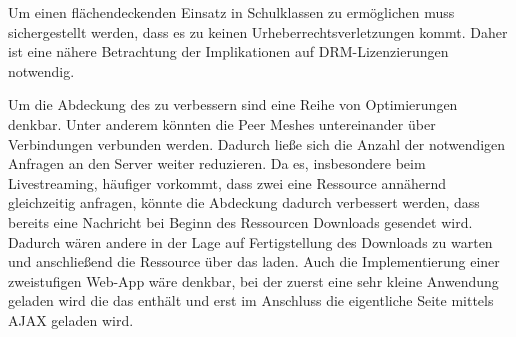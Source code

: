 Um einen flächendeckenden Einsatz in Schulklassen zu ermöglichen muss sichergestellt werden, dass es zu keinen Urheberrechtsverletzungen kommt. Daher ist eine nähere Betrachtung der Implikationen auf DRM-Lizenzierungen notwendig.

Um die Abdeckung des \pTp \cdns zu verbessern sind eine Reihe von Optimierungen denkbar. Unter anderem könnten die Peer Meshes untereinander über \pTp Verbindungen verbunden werden. Dadurch ließe sich die Anzahl der notwendigen Anfragen an den Server weiter reduzieren. Da es, insbesondere beim Livestreaming, häufiger vorkommt, dass zwei \clients eine Ressource annähernd gleichzeitig anfragen, könnte die Abdeckung dadurch verbessert werden, dass bereits eine Nachricht bei Beginn des Ressourcen Downloads gesendet wird. Dadurch wären andere \clients in der Lage auf Fertigstellung des Downloads zu warten und anschließend die Ressource über das \pTp \cdn laden. Auch die Implementierung einer zweistufigen Web-App wäre denkbar, bei der zuerst eine sehr kleine Anwendung geladen wird die das \pTp \cdn enthält und erst im Anschluss die eigentliche Seite mittels AJAX geladen wird. 

%


%
